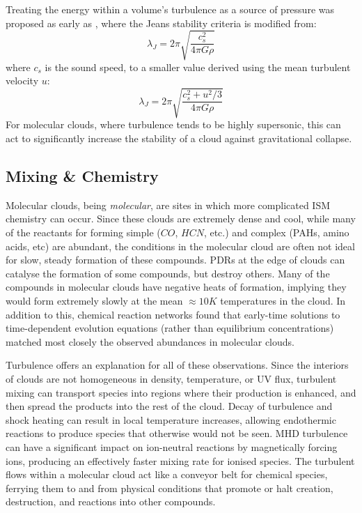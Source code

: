 \documentclass[12pt, preprint]{aastex}
\begin{document}
Treating the energy within a volume's turbulence as  a source of pressure was
proposed as early as \citet{chandra1951}, where the Jeans stability criteria is
modified from:
$$\lambda_J = 2\pi \sqrt{\frac{c_s^2}{4\pi G\rho}}$$
where $c_s$ is the sound speed, to a smaller value derived using the mean
turbulent velocity $u$:
$$\lambda_J = 2\pi \sqrt{\frac{c_s^2+u^2/3}{4\pi G\rho}}$$
For molecular clouds, where turbulence tends to be highly supersonic, this can
act to significantly increase the stability of a cloud against gravitational
collapse.
\subsection{Mixing \& Chemistry}
Molecular clouds, being \textit{molecular}, are sites in which more 
complicated ISM chemistry can occur.  Since these clouds are extremely dense and
cool, while many of the reactants for forming simple ($CO$, $HCN$, etc.) and
complex (PAHs, amino acids, etc) are abundant, the conditions in the molecular
cloud are often not ideal for slow, steady formation of these compounds.
PDRs at the edge of clouds can catalyse the formation of some compounds, but
destroy others.  Many of the compounds in molecular clouds have negative heats
of formation, implying they would form extremely slowly at the mean $\approx
10K$ temperatures in the cloud.  In addition to this, chemical reaction networks
found that early-time solutions to time-dependent evolution equations (rather
than equilibrium concentrations) matched most closely the observed abundances in
molecular clouds\citep{scalo2004}.

Turbulence offers an explanation for all of these observations.  Since the
interiors of clouds are not homogeneous in density, temperature, or UV flux,
turbulent mixing can transport species into regions where their production is
enhanced, and then spread the products into the rest of the cloud.  Decay of
turbulence and shock heating can result in local temperature increases, allowing 
endothermic reactions to produce species that otherwise would not be 
seen\citep{xie1995}.  MHD turbulence
can have a significant impact on ion-neutral reactions by magnetically forcing
ions, producing an effectively faster mixing rate for ionised species.
The turbulent flows within a molecular cloud act like a conveyor belt for
chemical species, ferrying them to and from physical conditions that promote or
halt creation, destruction, and reactions into other compounds.
\end{document}
